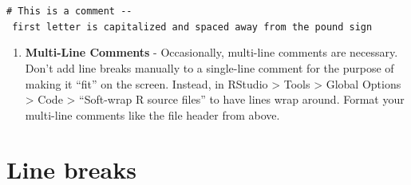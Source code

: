 \documentclass[]{book}
\providecommand{\tightlist}{%
  \setlength{\itemsep}{0pt}\setlength{\parskip}{0pt}}
\begin{document}
\texttt{\#\ This\ is\ a\ comment\ -\/-\ first\ letter\ is\ capitalized\ and\ spaced\ away\ from\ the\ pound\ sign}

\begin{enumerate}
\def\labelenumi{\arabic{enumi}.}
\setcounter{enumi}{3}
\tightlist
\item
  \textbf{Multi-Line Comments} - Occasionally, multi-line comments are
  necessary. Don't add line breaks manually to a single-line comment for
  the purpose of making it ``fit'' on the screen. Instead, in RStudio
  \textgreater{} Tools \textgreater{} Global Options \textgreater{} Code
  \textgreater{} ``Soft-wrap R source files'' to have lines wrap around.
  Format your multi-line comments like the file header from above.
\end{enumerate}

\section{Line breaks}\label{line-breaks}
\end{document}
